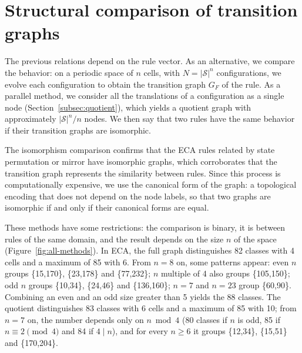 \section{Structural comparison of transition graphs}
\label{sec:structural}

The previous relations depend on the rule vector. As an alternative, we compare the behavior: on a periodic space of $n$ cells, with $N = |\mathcal{S}|^n$ configurations, we evolve each configuration to obtain the transition graph $G_F$ of the rule. As a parallel method, we consider all the translations of a configuration as a single node (Section~\ref{subsec:quotient}), which yields a quotient graph with approximately $|\mathcal{S}|^n / n$ nodes. We then say that two rules have the same behavior if their transition graphs are isomorphic.

The isomorphism comparison confirms that the ECA rules related by state permutation or mirror have isomorphic graphs, which corroborates that the transition graph represents the similarity between rules. Since this process is computationally expensive, we use the canonical form of the graph: a topological encoding that does not depend on the node labels, so that two graphs are isomorphic if and only if their canonical forms are equal.

These methods have some restrictions: the comparison is binary, it is between rules of the same domain, and the result depends on the size $n$ of the space (Figure~\ref{fig:all-methods}). In ECA, the full graph distinguishes 82 classes with 4 cells and a maximum of 85 with 6. From $n = 8$ on, some patterns appear: even $n$ groups \{15,170\}, \{23,178\} and \{77,232\}; $n$ multiple of 4 also groups \{105,150\}; odd $n$ groups \{10,34\}, \{24,46\} and \{136,160\}; $n = 7$ and $n = 23$ group \{60,90\}. Combining an even and an odd size greater than 5 yields the 88 classes. The quotient distinguishes 83 classes with 6 cells and a maximum of 85 with 10; from $n = 7$ on, the number depends only on $n \bmod 4$ (80 classes if $n$ is odd, 85 if $n \equiv 2 \pmod 4$ and 84 if $4 \mid n$), and for every $n \ge 6$ it groups \{12,34\}, \{15,51\} and \{170,204\}.

